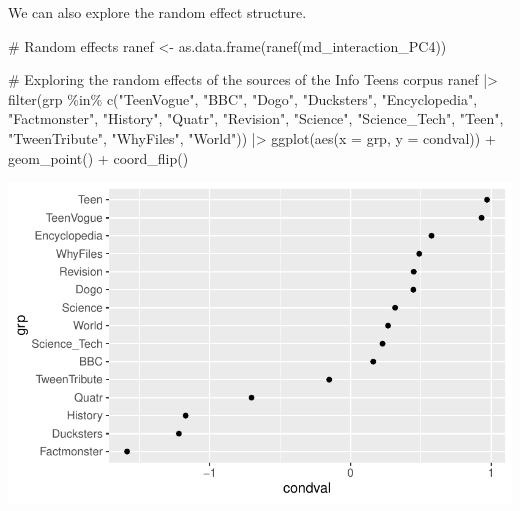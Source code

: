 \documentclass[
  letterpaper,
  DIV=11,
  numbers=noendperiod]{scrreprt}
\newenvironment{Shaded}{\begin{snugshade}}{\end{snugshade}}
\newcommand{\AttributeTok}[1]{\textcolor[rgb]{0.40,0.45,0.13}{#1}}
\newcommand{\CommentTok}[1]{\textcolor[rgb]{0.37,0.37,0.37}{#1}}
\newcommand{\FunctionTok}[1]{\textcolor[rgb]{0.28,0.35,0.67}{#1}}
\newcommand{\NormalTok}[1]{\textcolor[rgb]{0.00,0.23,0.31}{#1}}
\newcommand{\OtherTok}[1]{\textcolor[rgb]{0.00,0.23,0.31}{#1}}
\newcommand{\SpecialCharTok}[1]{\textcolor[rgb]{0.37,0.37,0.37}{#1}}
\newcommand{\StringTok}[1]{\textcolor[rgb]{0.13,0.47,0.30}{#1}}
\begin{document}
We can also explore the random effect structure.

\begin{Shaded}
\begin{Highlighting}[]
\CommentTok{\# Random effects}
\NormalTok{ranef }\OtherTok{\textless{}{-}} \FunctionTok{as.data.frame}\NormalTok{(}\FunctionTok{ranef}\NormalTok{(md\_interaction\_PC4))}

\CommentTok{\# Exploring the random effects of the sources of the Info Teens corpus}
\NormalTok{ranef }\SpecialCharTok{|\textgreater{}} 
  \FunctionTok{filter}\NormalTok{(grp }\SpecialCharTok{\%in\%} \FunctionTok{c}\NormalTok{(}\StringTok{"TeenVogue"}\NormalTok{, }\StringTok{"BBC"}\NormalTok{, }\StringTok{"Dogo"}\NormalTok{, }\StringTok{"Ducksters"}\NormalTok{, }\StringTok{"Encyclopedia"}\NormalTok{, }\StringTok{"Factmonster"}\NormalTok{, }\StringTok{"History"}\NormalTok{, }\StringTok{"Quatr"}\NormalTok{, }\StringTok{"Revision"}\NormalTok{, }\StringTok{"Science"}\NormalTok{, }\StringTok{"Science\_Tech"}\NormalTok{, }\StringTok{"Teen"}\NormalTok{, }\StringTok{"TweenTribute"}\NormalTok{, }\StringTok{"WhyFiles"}\NormalTok{, }\StringTok{"World"}\NormalTok{)) }\SpecialCharTok{|\textgreater{}} 
  \FunctionTok{ggplot}\NormalTok{(}\FunctionTok{aes}\NormalTok{(}\AttributeTok{x =}\NormalTok{ grp, }\AttributeTok{y =}\NormalTok{ condval)) }\SpecialCharTok{+}
  \FunctionTok{geom\_point}\NormalTok{() }\SpecialCharTok{+}
  \FunctionTok{coord\_flip}\NormalTok{()}
\end{Highlighting}
\end{Shaded}

\includegraphics{G_Ch7_Analysis_files/figure-pdf/unnamed-chunk-20-1.pdf}

\begin{Shaded}
\end{Shaded}
\end{document}
